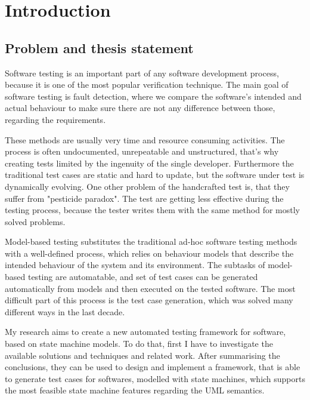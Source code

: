 \chapter*{Introduction}
\label{cha:introduction}

\section*{Problem and thesis statement}
\label{sec:problem}

Software testing is an important part of any software development process, because it is one of the most popular verification technique. The main goal of software testing is fault detection, where we compare the software's intended and actual behaviour to make sure there are not any difference between those, regarding the requirements.

These methods are usually very time and resource consuming activities. The process is often undocumented, unrepeatable and unstructured, that's why creating tests limited by the ingenuity of the single developer. Furthermore the traditional test cases are static and hard to update, but the software under test is dynamically evolving. One other problem of the handcrafted test is, that they suffer from "pesticide paradox". The test are getting less effective during the testing process, because the tester writes them with the same method for mostly solved problems.

Model-based testing substitutes the traditional ad-hoc software testing methods with a well-defined process, which relies on behaviour models that describe the intended behaviour of the system and its environment. The subtasks of model-based testing are automatable, and set of test cases can be generated automatically from models and then executed on the tested software. The most difficult part of this process is the test case generation, which was solved many different ways in the last decade.

My research aims to create a new automated testing framework for software, based on state machine models. To do that, first I have to investigate the available solutions and techniques and related work. After summarising the conclusions, they can be used to design and implement a framework, that is able to generate test cases for softwares, modelled with state machines, which supports the most feasible state machine features regarding the UML semantics.

